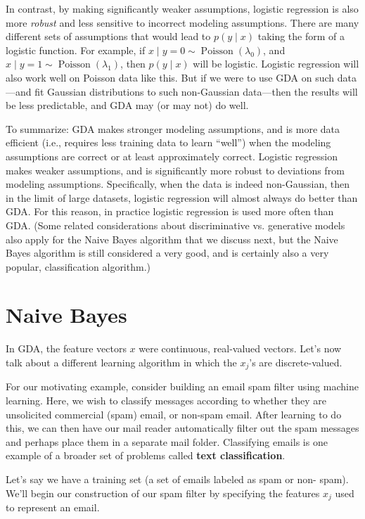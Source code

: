 In contrast, by making significantly weaker assumptions, logistic regression
is also more \textit{robust} and less sensitive to incorrect modeling assumptions.
There are many different sets of assumptions that would lead to $p(y \mid x)$ taking
the form of a logistic function. For example, if $x \mid y = 0 \sim \operatorname{Poisson}(\lambda_0)$, and
$x \mid y = 1 \sim \operatorname{Poisson}(\lambda_1)$, then $p(y \mid x)$ will be logistic. Logistic regression will
also work well on Poisson data like this. But if we were to use GDA on such
data---and fit Gaussian distributions to such non-Gaussian data---then the
results will be less predictable, and GDA may (or may not) do well.

To summarize: GDA makes stronger modeling assumptions, and is more
data efficient (i.e., requires less training data to learn ``well'') when the modeling
assumptions are correct or at least approximately correct. Logistic
regression makes weaker assumptions, and is significantly more robust to
deviations from modeling assumptions. Specifically, when the data is indeed
non-Gaussian, then in the limit of large datasets, logistic regression will
almost always do better than GDA. For this reason, in practice logistic regression
is used more often than GDA. (Some related considerations about
discriminative vs. generative models also apply for the Naive Bayes algorithm
that we discuss next, but the Naive Bayes algorithm is still considered
a very good, and is certainly also a very popular, classification algorithm.)

\chapter{Naive Bayes}
In GDA, the feature vectors $x$ were continuous, real-valued vectors. Let's
now talk about a different learning algorithm in which the $x_j$'s are discrete-valued.

For our motivating example, consider building an email spam filter using
machine learning. Here, we wish to classify messages according to whether
they are unsolicited commercial (spam) email, or non-spam email. After
learning to do this, we can then have our mail reader automatically filter
out the spam messages and perhaps place them in a separate mail folder.
Classifying emails is one example of a broader set of problems called \textbf{text
classification}.

Let's say we have a training set (a set of emails labeled as spam or non-
spam). We'll begin our construction of our spam filter by specifying the
features $x_j$ used to represent an email.

